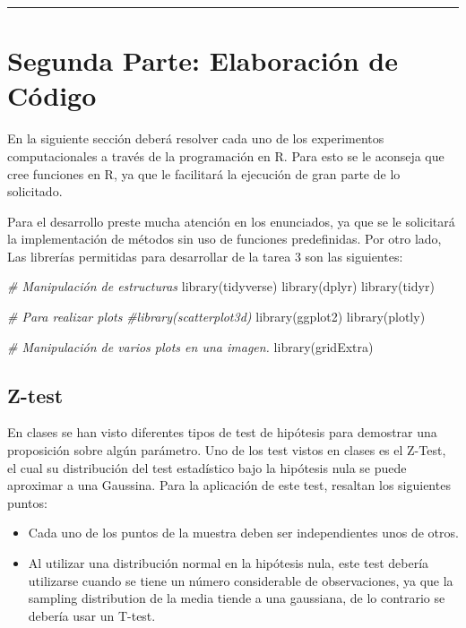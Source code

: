 \documentclass[]{article}
\newenvironment{Shaded}{\begin{snugshade}}{\end{snugshade}}
\newcommand{\CommentTok}[1]{\textcolor[rgb]{0.56,0.35,0.01}{\textit{#1}}}
\newcommand{\FunctionTok}[1]{\textcolor[rgb]{0.00,0.00,0.00}{#1}}
\newcommand{\NormalTok}[1]{#1}
\providecommand{\tightlist}{%
  \setlength{\itemsep}{0pt}\setlength{\parskip}{0pt}}
\begin{document}
\begin{center}\rule{0.5\linewidth}{0.5pt}\end{center}

\hypertarget{segunda-parte-elaboracion-de-codigo}{%
\section{Segunda Parte: Elaboración de
Código}\label{segunda-parte-elaboracion-de-codigo}}

En la siguiente sección deberá resolver cada uno de los experimentos
computacionales a través de la programación en R. Para esto se le
aconseja que cree funciones en R, ya que le facilitará la ejecución de
gran parte de lo solicitado.

Para el desarrollo preste mucha atención en los enunciados, ya que se le
solicitará la implementación de métodos sin uso de funciones
predefinidas. Por otro lado, Las librerías permitidas para desarrollar
de la tarea 3 son las siguientes:

\begin{Shaded}
\begin{Highlighting}[]
\CommentTok{\# Manipulación de estructuras}
\FunctionTok{library}\NormalTok{(tidyverse)}
\FunctionTok{library}\NormalTok{(dplyr)}
\FunctionTok{library}\NormalTok{(tidyr)}

\CommentTok{\# Para realizar plots}
\CommentTok{\#library(scatterplot3d)}
\FunctionTok{library}\NormalTok{(ggplot2)}
\FunctionTok{library}\NormalTok{(plotly)}

\CommentTok{\# Manipulación de varios plots en una imagen.}
\FunctionTok{library}\NormalTok{(gridExtra)}
\end{Highlighting}
\end{Shaded}

\hypertarget{z-test}{%
\subsection{Z-test}\label{z-test}}

En clases se han visto diferentes tipos de test de hipótesis para
demostrar una proposición sobre algún parámetro. Uno de los test vistos
en clases es el Z-Test, el cual su distribución del test estadístico
bajo la hipótesis nula se puede aproximar a una Gaussina. Para la
aplicación de este test, resaltan los siguientes puntos:

\begin{itemize}
\tightlist
\item
  Cada uno de los puntos de la muestra deben ser independientes unos de
  otros.
\item
  Al utilizar una distribución normal en la hipótesis nula, este test
  debería utilizarse cuando se tiene un número considerable de
  observaciones, ya que la sampling distribution de la media tiende a
  una gaussiana, de lo contrario se debería usar un T-test.
\end{itemize}
\end{document}
